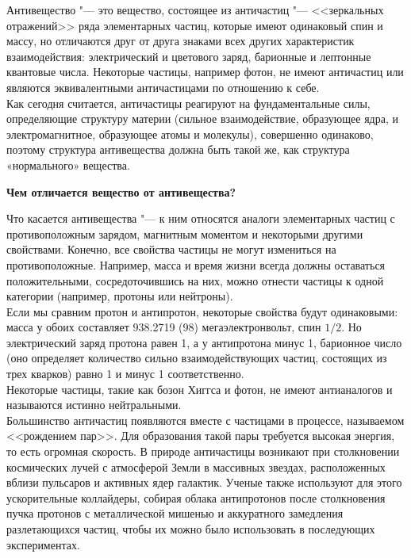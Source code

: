 \begin{flushleft}
Антивещество "--- это вещество, состоящее из античастиц "--- <<зеркальных отражений>> ряда элементарных
 частиц, которые имеют одинаковый спин и массу, но отличаются друг от друга знаками всех других 
 характеристик взаимодействия: электрический и цветового заряд, барионные и лептонные квантовые числа. 
 Некоторые частицы, например фотон, не имеют античастиц или являются эквивалентными античастицами по отношению к себе. \\
 
 Как сегодня считается, античастицы реагируют на фундаментальные силы, определяющие структуру материи 
 (сильное взаимодействие, образующее ядра, и электромагнитное, образующее атомы и молекулы), совершенно 
 одинаково, поэтому структура антивещества должна быть такой же, как структура «нормального» вещества.

 \newpage
 \textbf{Чем отличается вещество от антивещества?}
 \vspace*{14pt}

 Что касается антивещества "--- к ним относятся аналоги элементарных частиц с противоположным зарядом, 
 магнитным моментом и некоторыми другими свойствами. Конечно, все свойства частицы не могут измениться 
 на противоположные. Например, масса и время жизни всегда должны оставаться положительными, 
 сосредоточившись на них, можно отнести частицы к одной категории (например, протоны или нейтроны). \\

Если мы сравним протон и антипротон, некоторые свойства будут одинаковыми: масса у обоих составляет 938.2719 (98) 
мегаэлектронвольт, спин $1/2$. Но электрический заряд протона равен 1, а у антипротона минус 1, барионное число 
(оно определяет количество сильно взаимодействующих частиц, состоящих из трех кварков) равно 1 и минус 1 соответственно.\\

Некоторые частицы, такие как бозон Хиггса и фотон, не имеют антианалогов и называются истинно нейтральными.\\

Большинство античастиц появляются вместе с частицами в процессе, называемом <<рождением пар>>. Для образования 
такой пары требуется высокая энергия, то есть огромная скорость. В природе античастицы возникают при столкновении 
космических лучей с атмосферой Земли в массивных звездах, расположенных вблизи пульсаров и активных ядер 
галактик. Ученые также используют для этого ускорительные коллайдеры, собирая облака антипротонов после столкновения 
пучка протонов с металлической мишенью и аккуратного замедления разлетающихся частиц, чтобы их можно было использовать 
в последующих экспериментах. \\



\end{flushleft}
